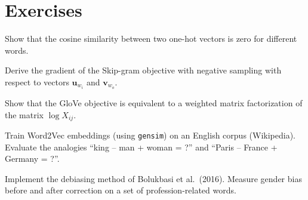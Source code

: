 \section{Exercises}
\label{sec:emb:exercises}

\begin{exercise}[$\star$]
Show that the cosine similarity between two one-hot vectors is zero for
different words.
\end{exercise}

\begin{exercise}[$\star\star$]
Derive the gradient of the Skip-gram objective with negative sampling with
respect to vectors $\mathbf{u}_{w_i}$ and $\mathbf{v}_{w_o}$.
\end{exercise}

\begin{exercise}[$\star\star$]
Show that the GloVe objective is equivalent to a weighted matrix factorization
of the matrix $\log X_{ij}$.
\end{exercise}

\begin{exercise}[$\star\star$]
Train Word2Vec embeddings (using \texttt{gensim}) on an English corpus
(Wikipedia). Evaluate the analogies ``king -- man + woman = ?'' and
``Paris -- France + Germany = ?''.
\end{exercise}

\begin{exercise}[$\star\star\star$]
Implement the debiasing method of Bolukbasi et al.\ (2016). Measure gender
bias before and after correction on a set of profession-related words.
\end{exercise}

